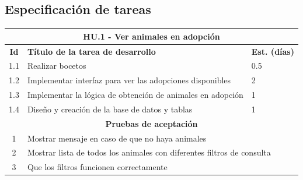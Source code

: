 \subsection{Especificación de tareas}


\begin{tabular}{|c|p{9.5cm}|p{1cm}|}
	\hline
	\multicolumn{3}{|c|}{\textbf{HU.1 - Ver animales en adopción}} \\
	\hline
	\textbf{Id} & \textbf{Título de la tarea de desarrollo} & \textbf{Est. (días)} \\
	\hline
	1.1 & Realizar bocetos & 0.5 \\ \hline
	1.2 &  Implementar interfaz para ver las adopciones disponibles & 2 \\ \hline
	1.3 &  Implementar la lógica de obtención de animales en adopción & 1 \\ \hline
	1.4 &  Diseño y creación de la base de datos y tablas & 1 \\ \hline
	\multicolumn{3}{|c|}{\textbf{Pruebas de aceptación}} \\ \hline
	1 & \multicolumn{2}{|l|}{Mostrar mensaje en caso de que no haya animales} \\ \hline
	2 & \multicolumn{2}{|l|}{Mostrar lista de todos los animales con diferentes filtros de consulta} \\ \hline
	3 & \multicolumn{2}{|l|}{Que los filtros funcionen correctamente} \\ \hline
	
\end{tabular} \\ \\

\label{sec:hu1}

